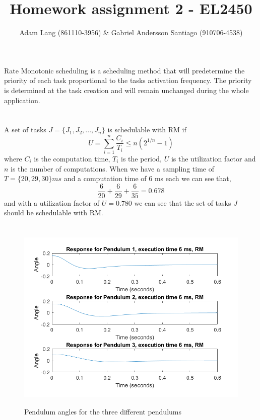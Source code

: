 \documentclass[12pt,a4paper]{article}
\title{Homework assignment 2 - EL2450}
\author{Adam Lang (861110-3956) \& Gabriel Andersson Santiago
(910706-4538)}
\begin{document}
\maketitle
\section{} %
  Rate Monotonic scheduling is a scheduling method that will
  predetermine the priority of each task proportional to the tasks
  activation frequency. The priority is determined at the task creation
  and will remain unchanged during the whole application.

\section{} %
  A set of tasks $J=\{J_1,J_2,...,J_n\}$ is schedulable with RM if
  \begin{equation}
    U=\sum\limits_{i=1}^n \frac{C_i}{T_i} \leq n(2^{1/n}-1)
  \end{equation}
  where $C_i$ is the computation time, $T_i$ is the period, $U$ is the
  utilization factor and $n$ is the
  number of computations. When we have a sampling time of 
  $T=\{20, 29, 30\}ms$ and a computation time of 6 ms each we can see that,
  \begin{equation}
    \frac{6}{20}+\frac{6}{29}+\frac{6}{35}=0.678
  \end{equation}
  and with a utilization factor of $U = 0.780$ we can see that the set
  of tasks $J$ should be schedulable with RM.

\section{}%
  \begin{center}
      \begin{figure}
        \includegraphics[scale=0.5]{ex31.png}
        \label{fig:ex31}
        \caption{Pendulum angles for the three different pendulums}
      \end{figure}
    \end{center}
    
\end{document}
